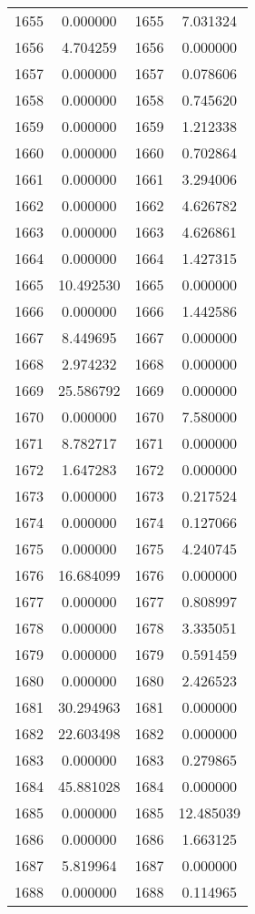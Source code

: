 \documentclass[12pt]{article}
\begin{document}
\begin{longtable}{@{}cccc@{}}
1655 & 0.000000 & 1655 & 7.031324 \\
1656 & 4.704259 & 1656 & 0.000000 \\
1657 & 0.000000 & 1657 & 0.078606 \\
1658 & 0.000000 & 1658 & 0.745620 \\
1659 & 0.000000 & 1659 & 1.212338 \\
1660 & 0.000000 & 1660 & 0.702864 \\
1661 & 0.000000 & 1661 & 3.294006 \\
1662 & 0.000000 & 1662 & 4.626782 \\
1663 & 0.000000 & 1663 & 4.626861 \\
1664 & 0.000000 & 1664 & 1.427315 \\
1665 & 10.492530 & 1665 & 0.000000 \\
1666 & 0.000000 & 1666 & 1.442586 \\
1667 & 8.449695 & 1667 & 0.000000 \\
1668 & 2.974232 & 1668 & 0.000000 \\
1669 & 25.586792 & 1669 & 0.000000 \\
1670 & 0.000000 & 1670 & 7.580000 \\
1671 & 8.782717 & 1671 & 0.000000 \\
1672 & 1.647283 & 1672 & 0.000000 \\
1673 & 0.000000 & 1673 & 0.217524 \\
1674 & 0.000000 & 1674 & 0.127066 \\
1675 & 0.000000 & 1675 & 4.240745 \\
1676 & 16.684099 & 1676 & 0.000000 \\
1677 & 0.000000 & 1677 & 0.808997 \\
1678 & 0.000000 & 1678 & 3.335051 \\
1679 & 0.000000 & 1679 & 0.591459 \\
1680 & 0.000000 & 1680 & 2.426523 \\
1681 & 30.294963 & 1681 & 0.000000 \\
1682 & 22.603498 & 1682 & 0.000000 \\
1683 & 0.000000 & 1683 & 0.279865 \\
1684 & 45.881028 & 1684 & 0.000000 \\
1685 & 0.000000 & 1685 & 12.485039 \\
1686 & 0.000000 & 1686 & 1.663125 \\
1687 & 5.819964 & 1687 & 0.000000 \\
1688 & 0.000000 & 1688 & 0.114965 \\

\end{longtable}
\end{document}
